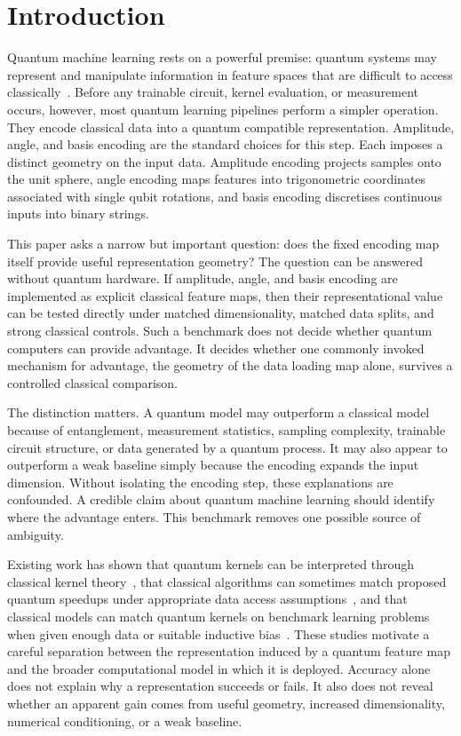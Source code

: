 \documentclass[12pt]{article}
\begin{document}
\section{Introduction}
\label{sec:intro}

Quantum machine learning rests on a powerful premise: quantum systems may
represent and manipulate information in feature spaces that are difficult to
access classically~\citep{havlicek2019,schuld2019}. Before any trainable
circuit, kernel evaluation, or measurement occurs, however, most quantum
learning pipelines perform a simpler operation. They encode classical data into
a quantum compatible representation. Amplitude, angle, and basis encoding are
the standard choices for this step. Each imposes a distinct geometry on the
input data. Amplitude encoding projects samples onto the unit sphere, angle
encoding maps features into trigonometric coordinates associated with
single qubit rotations, and basis encoding discretises continuous inputs into
binary strings.

This paper asks a narrow but important question: does the fixed encoding map
itself provide useful representation geometry? The question can be answered
without quantum hardware. If amplitude, angle, and basis encoding are
implemented as explicit classical feature maps, then their representational
value can be tested directly under matched dimensionality, matched data splits,
and strong classical controls. Such a benchmark does not decide whether quantum
computers can provide advantage. It decides whether one commonly invoked
mechanism for advantage, the geometry of the data loading map alone, survives a
controlled classical comparison.

The distinction matters. A quantum model may outperform a classical model
because of entanglement, measurement statistics, sampling complexity, trainable
circuit structure, or data generated by a quantum process. It may also appear to
outperform a weak baseline simply because the encoding expands the input
dimension. Without isolating the encoding step, these explanations are
confounded. A credible claim about quantum machine learning should identify
where the advantage enters. This benchmark removes one possible source of
ambiguity.

Existing work has shown that quantum kernels can be interpreted through
classical kernel theory~\citep{schuld2019}, that classical algorithms can
sometimes match proposed quantum speedups under appropriate data access
assumptions~\citep{tang2019}, and that classical models can match quantum
kernels on benchmark learning problems when given enough data or suitable
inductive bias~\citep{huang2021,kubler2021}. These studies motivate a careful
separation between the representation induced by a quantum feature map and the
broader computational model in which it is deployed. Accuracy alone does not
explain why a representation succeeds or fails. It also does not reveal whether
an apparent gain comes from useful geometry, increased dimensionality, numerical
conditioning, or a weak baseline.
\end{document}
